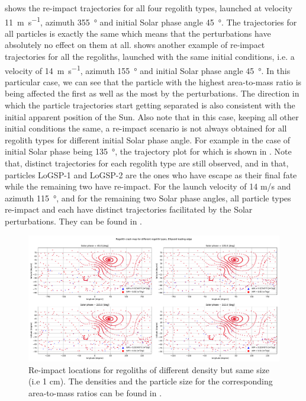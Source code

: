  shows the re-impact trajectories for all four regolith types, launched at velocity \SI{11}{\metre\per\second}, azimuth \SI{355}{\degree} and initial Solar phase angle \SI{45}{\degree}. The trajectories for all particles is exactly the same which means that the perturbations have absolutely no effect on them at all.  shows another example of re-impact trajectories for all the regoliths, launched with the same initial conditions, i.e. a velocity of \SI{14}{\metre\per\second}, azimuth \SI{155}{\degree} and initial Solar phase angle \SI{45}{\degree}. In this particular case, we can see that the particle with the highest area-to-mass ratio is being affected the first as well as the most by the perturbations. The direction in which the particle trajectories start getting separated is also consistent with the initial apparent position of the Sun. Also note that in this case, keeping all other initial conditions the same, a re-impact scenario is not always obtained for all regolith types for different initial Solar phase angle. For example in the case of initial Solar phase being \SI{135}{\degree}, the trajectory plot for which is shown in . Note that, distinct trajectories for each regolith type are still observed, and in that, particles LoGSP-1 and LoGSP-2 are the ones who have escape as their final fate while the remaining two have re-impact. For the launch velocity of 14 m/s and azimuth \SI{115}{\degree}, and for the remaining two Solar phase angles, all particle types re-impact and each have distinct trajectories facilitated by the Solar perturbations. They can be found in .
\begin{figure}[htb]
\centering
\captionsetup{justification=centering}
\includegraphics[angle=90, width=\textwidth, height=\textheight, keepaspectratio=true]{leading_edge_perturbations/crashMap_3P2_7P5_density_1cm_radius.pdf}
\caption{Re-impact locations for regoliths of different density but same size (i.e 1 cm). The densities and the particle size for the corresponding area-to-mass ratios can be found in .}
\label{fig:crashmap_3.2_7.5_density_1cmRadius_leadingEdge}
\end{figure}
